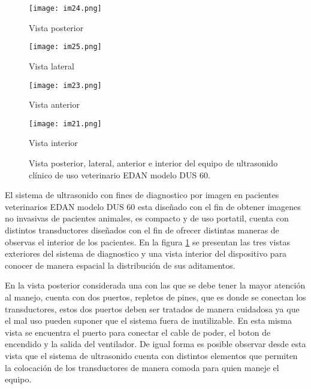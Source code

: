 \documentclass[letterpaper,12pt,oneside]{book}
\begin{document}
\begin{figure}[h!]
    \centering
    \begin{minipage}[b]{0.45\textwidth}
        \centering
        \texttt{[image: im24.png]}
        \caption{Vista posterior}
        \label{fig:imagen1}
    \end{minipage}
    \hfill
    \begin{minipage}[b]{0.45\textwidth}
        \centering
        \texttt{[image: im25.png]}
        \caption{Vista lateral}
        \label{fig:imagen2}
    \end{minipage}
    
    \vspace{0.5cm}
    
    \begin{minipage}[b]{0.45\textwidth}
        \centering
        \texttt{[image: im23.png]}
        \caption{Vista anterior}
        \label{fig:imagen3}
    \end{minipage}
    \hfill
    \begin{minipage}[b]{0.45\textwidth}
        \centering
        \texttt{[image: im21.png]}
        \caption{Vista interior}
        \label{fig:imagen4}
    \end{minipage}

    \caption{Vista posterior, lateral, anterior e interior del equipo de ultrasonido clínico de uso veterinario EDAN modelo DUS 60.}
    \label{fig:cuatro_imagenes}
\end{figure}


El sistema de ultrasonido con fines de diagnostico por imagen en pacientes veterinarios EDAN modelo DUS 60 esta diseñado con el fin de obtener imagenes no invasivas de pacientes animales, es compacto y de uso portatil, cuenta con distintos transductores diseñados con el fin de ofrecer distintas maneras de observas el interior de los pacientes. En la figura \ref{fig:cuatro_imagenes} se presentan las tres vistas exteriores del sistema de diagnostico y una vista interior del dispositivo para conocer de manera espacial la distribución de sus aditamentos. 

\vspace{10pt}


En la vista posterior considerada una con las que se debe tener la mayor atención al manejo, cuenta con dos puertos, repletos de pines, que es donde se conectan los transductores, estos dos puertos deben ser tratados de manera cuidadosa ya que el mal uso pueden suponer que el sistema fuera de inutilizable. En esta misma vista se encuentra el puerto para conectar el cable de poder, el boton de encendido y la salida del ventilador. De igual forma es posible observar desde esta vista que el sistema de ultrasonido cuenta con distintos elementos que permiten la colocación de los transductores de manera comoda para quien maneje el equipo.
\end{document}
